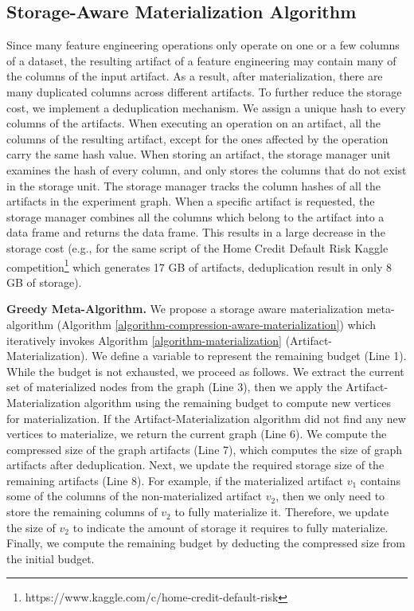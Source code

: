 \subsection{Storage-Aware Materialization Algorithm}
Since many feature engineering operations only operate on one or a few columns of a dataset, the resulting artifact of a feature engineering may contain many of the columns of the input artifact.
As a result, after materialization, there are many duplicated columns across different artifacts.
To further reduce the storage cost, we implement a deduplication mechanism.
We assign a unique hash to every columns of the artifacts.
When executing an operation on an artifact, all the columns of the resulting artifact, except for the ones affected by the operation carry the same hash value.
When storing an artifact, the storage manager unit examines the hash of every column, and only stores the columns that do not exist in the storage unit.
The storage manager tracks the column hashes of all the artifacts in the experiment graph.
When a specific artifact is requested, the storage manager combines all the columns which belong to the artifact into a data frame and returns the data frame.
This results in a large decrease in the storage cost (e.g., for the same script of the Home Credit Default Risk Kaggle competition\footnote{https://www.kaggle.com/c/home-credit-default-risk} which generates 17 GB of artifacts, deduplication result in only 8 GB of storage).

\textbf{Greedy Meta-Algorithm.}
We propose a storage aware materialization meta-algorithm (Algorithm \ref{algorithm-compression-aware-materialization}) which iteratively invokes Algorithm \ref{algorithm-materialization} (Artifact-Materialization).
We define a variable to represent the remaining budget (Line 1).
While the budget is not exhausted, we proceed as follows.
We extract the current set of materialized nodes from the graph (Line 3), then we apply the Artifact-Materialization algorithm using the remaining budget to compute new vertices for materialization.
If the Artifact-Materialization algorithm did not find any new vertices to materialize, we return the current graph (Line 6).
We compute the compressed size of the graph artifacts (Line 7), which computes the size of graph artifacts after deduplication. 
Next, we update the required storage size of the remaining artifacts (Line 8).
For example, if the materialized artifact $v_1$ contains some of the columns of the non-materialized artifact $v_2$, then we only need to store the remaining columns of $v_2$ to fully materialize it.
Therefore, we update the size of $v_2$ to indicate the amount of storage it requires to fully materialize.
Finally, we compute the remaining budget by deducting the compressed size from the initial budget.

